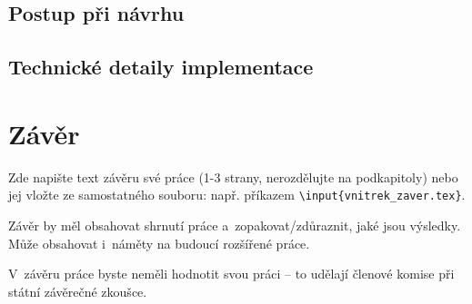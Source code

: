 \documentclass[a4paper,oneside,12pt]{book}
\begin{document}
\section{Postup při návrhu}


\section{Technické detaily implementace}

\chapter*{Závěr}
%
Zde napište text závěru své práce (1-3 strany, nerozdělujte na podkapitoly) nebo jej vložte ze samostatného souboru: např. příkazem \texttt{\textbackslash input\{vnitrek\_zaver.tex\}}. \par Závěr by měl obsahovat shrnutí práce a~zopakovat/zdůraznit, jaké jsou výsledky. Může obsahovat i~náměty na budoucí rozšířené práce. \par V~závěru práce byste neměli hodnotit svou práci -- to udělají členové komise při státní závěrečné zkoušce.
%
%
\end{document}
